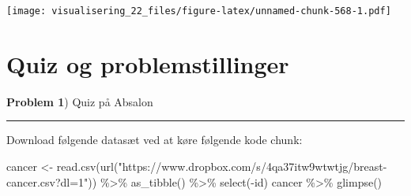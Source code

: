 \documentclass[
]{book}
\newenvironment{Shaded}{\begin{snugshade}}{\end{snugshade}}
\newcommand{\FunctionTok}[1]{\textcolor[rgb]{0.00,0.00,0.00}{#1}}
\newcommand{\NormalTok}[1]{#1}
\newcommand{\OtherTok}[1]{\textcolor[rgb]{0.56,0.35,0.01}{#1}}
\newcommand{\SpecialCharTok}[1]{\textcolor[rgb]{0.00,0.00,0.00}{#1}}
\newcommand{\StringTok}[1]{\textcolor[rgb]{0.31,0.60,0.02}{#1}}
\begin{document}
\texttt{[image: visualisering\_22\_files/figure-latex/unnamed-chunk-568-1.pdf]}

\hypertarget{quiz-og-problemstillinger}{%
\section{Quiz og problemstillinger}\label{quiz-og-problemstillinger}}

\textbf{Problem 1}) Quiz på Absalon

\begin{center}\rule{0.5\linewidth}{0.5pt}\end{center}

Download følgende datasæt ved at køre følgende kode chunk:

\begin{Shaded}
\begin{Highlighting}[]
\NormalTok{cancer }\OtherTok{\textless{}{-}} \FunctionTok{read.csv}\NormalTok{(}\FunctionTok{url}\NormalTok{(}\StringTok{"https://www.dropbox.com/s/4qa37itw9wtwtjg/breast{-}cancer.csv?dl=1"}\NormalTok{)) }\SpecialCharTok{\%\textgreater{}\%} \FunctionTok{as\_tibble}\NormalTok{() }\SpecialCharTok{\%\textgreater{}\%} \FunctionTok{select}\NormalTok{(}\SpecialCharTok{{-}}\NormalTok{id)}
\NormalTok{cancer }\SpecialCharTok{\%\textgreater{}\%} \FunctionTok{glimpse}\NormalTok{()}
\end{Highlighting}
\end{Shaded}
\end{document}
